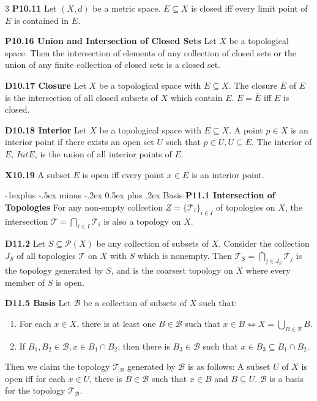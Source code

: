\documentclass[10pt, landscape]{article}
\makeatletter
\renewcommand{\section}{\@startsection{section}{1}{0mm}%
                                {-1ex plus -.5ex minus -.2ex}%
                                {0.5ex plus .2ex}%
                                {\normalfont\large\bfseries}}
\renewcommand{\section}{\@startsection{section}{2}{0mm}%
                                {-1explus -.5ex minus -.2ex}%
                                {0.5ex plus .2ex}%
                                {\normalfont\normalsize\bfseries}}
\makeatother
\begin{document}
\begin{multicols*}{3}
\textbf{P10.11} Let $(X, d)$ be a metric space. $E \subseteq X$ is closed iff every limit point of $E$ is contained in $E$.

\textbf{P10.16 Union and Intersection of Closed Sets} Let $X$ be a topological space. Then the intersection of elements of any collection of closed sets or the union of any finite collection of closed sets is a closed set.

\textbf{D10.17 Closure} Let $X$ be a topological space with $E \subseteq X$. The closure $\overline{E}$ of $E$ is the intersection of all closed subsets of $X$ which contain $E$. $E=\overline{E}$ iff $E$ is closed.

\textbf{D10.18 Interior} Let $X$ be a topological space with $E \subseteq X$. A point $p \in X$ is an interior point if there exists an open set $U$ such that $p \in U, U \subseteq E$. The interior of $E$, $IntE$, is the union of all interior points of $E$.

\textbf{X10.19} A subset $E$ is open iff every point $x \in E$ is an interior point.

\section{Basis}
\textbf{P11.1 Intersection of Topologies} For any non-empty collcetion $Z=\{\mathcal{T}_i\}_{i \in I}$ of topologies on $X$, the intersection $\mathcal{T}=\bigcap_{i\in I}\mathcal{T}_i$ is also a topology on $X$.

\textbf{D11.2} Let $S \subseteq \mathcal{P}(X)$ be any collection of subsets of $X$. Consider the collection $J_S$ of all topologies $\mathcal{T}$ on $X$ with $S$ which is nonempty. Then $\mathcal{T}_S=\bigcap_{j \in J_S}\mathcal{T}_j$ is the topology generated by $S$, and is the coarsest topology on $X$ where every member of $S$ is open.

\textbf{D11.5 Basis} Let $\mathcal{B}$ be a collection of subsets of $X$ such that:
\begin{enumerate}
    \item For each $x \in X$, there is at least one $B \in \mathcal{B}$ such that $x \in B \Leftrightarrow X = \bigcup_{B \in \mathcal{B}} B$.
    \item If $B_1, B_2 \in \mathcal{B}, x \in B_1 \cap B_2$, then there is $B_3 \in \mathcal{B}$ such that $x \in B_3 \subseteq B_1 \cap B_2$.
\end{enumerate}
Then we claim the topology $\mathcal{T}_\mathcal{B}$ generated by $\mathcal{B}$ is as follows: A subset $U$ of $X$ is open iff for each $x \in U$, there is $B \in \mathcal{B}$ such that $x \in B$ and $B \subseteq U$. $\mathcal{B}$ is a basis for the topology $\mathcal{T}_\mathcal{B}$.


\end{multicols*}
\end{document}
